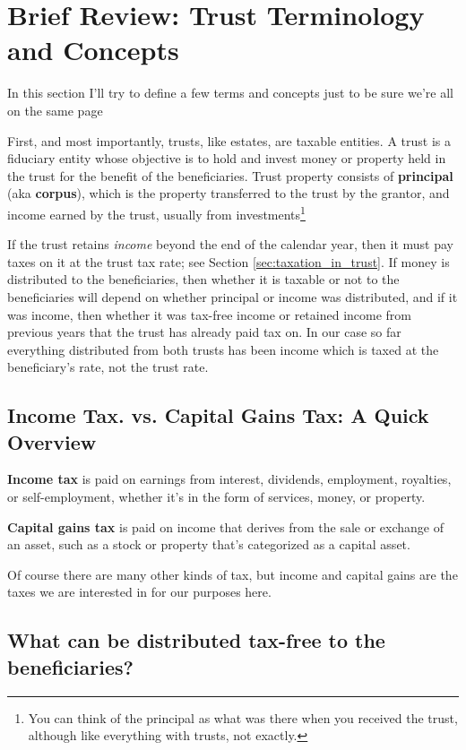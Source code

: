 \documentclass[11pt, oneside]{article}   	%
\theoremstyle{definition}
\begin{document}
\section{Brief Review: Trust Terminology and Concepts}
\label{sec:trust_terminology_and_concepts}
In this section I'll try to define a few terms and concepts just to be sure we're all on the same page

\bigskip
\noindent
First, and most importantly, trusts, like estates, are taxable entities. A trust is a fiduciary entity whose objective is to hold and 
invest money or property held in the trust for the benefit of the beneficiaries. Trust property
consists of \textbf{principal} (aka \textbf{corpus}), which is the property transferred
to the trust by the grantor, and income earned by the trust, usually
from investments\footnote{You can think of the principal as what was there when you received the trust, although like everything with trusts, not exactly.} 

\bigskip
\noindent
If the trust retains \emph{income} beyond the end of the calendar year, then it must pay taxes on it at the trust tax rate; see
Section \ref{sec:taxation_in_trust}.  If money is distributed to the beneficiaries, then whether it is taxable or not to the
beneficiaries will depend on whether principal or income was distributed, and if it was income, then whether it was tax-free income 
or retained income from previous years that the trust has already paid tax on. In our case so far everything distributed
from both trusts has been income which is taxed at the beneficiary's rate, not the trust rate.

\subsection{Income Tax. vs. Capital Gains Tax: A Quick Overview}
\textbf{Income tax} is paid on earnings from interest, dividends, employment,
royalties, or self-employment, whether it's in the form of services,
money, or property. 

\bigskip
\noindent
\textbf{Capital gains tax} is paid on income that derives
from the sale or exchange of an asset, such as a stock or property
that's categorized as a capital asset. 

\bigskip
\noindent
Of course there are many other kinds of tax, but income and capital gains are the taxes we are interested in for our 
purposes here.

\subsection{What can be distributed tax-free to the beneficiaries?}
\end{document}
